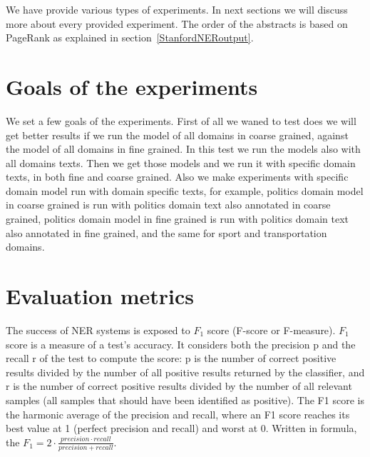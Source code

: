 \documentclass[thesis=M,english]{FITthesis}[2018/05/30]
\begin{document}
We have provide various types of experiments. In next sections we will discuss more about every provided experiment. The order of the abstracts is based on PageRank as explained in section~\ref{StanfordNERoutput}.

\section{Goals of the experiments}
	We set a few goals of the experiments. First of all we waned to test does we will get better results if we run the model of all domains in coarse grained, against the model of all domains in fine grained. In this test we run the models also with all domains texts. Then we get those models and we run it with specific domain texts, in both fine and coarse grained. Also we make experiments with specific domain model run with domain specific texts, for example, politics domain model in coarse grained is run with politics domain text also annotated in coarse grained, politics domain model in fine grained is run with politics domain text also annotated in fine grained, and the same for sport and transportation domains.

\section{Evaluation metrics}
	The success of NER systems is exposed to $F_{1}$ score (F-score or F-measure). $F_{1}$ \cite{wiki:F1} score  is a measure of a test's accuracy. It considers both the precision p  and the recall r of the test to compute the score: p is the number of correct positive results divided by the number of all positive results returned by the classifier, and r is the number of correct positive results divided by the number of all relevant samples (all samples that should have been identified as positive). The F1 score is the harmonic average of the precision and recall, where an F1 score reaches its best value at 1 (perfect precision and recall) and worst at 0. 
Written in formula, the $F_{1} =2\cdot \frac{precision \cdot recall}{precision + recall}$.
\end{document}
